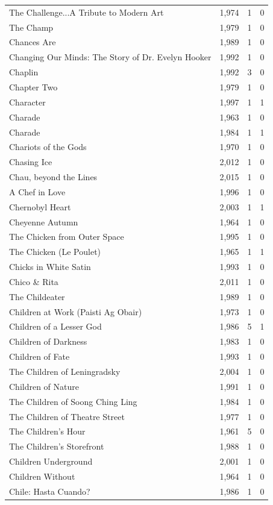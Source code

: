 \begin{tabular}{lrrr}
The Challenge...A Tribute to Modern Art & 1,974 & 1 & 0 \\
The Champ & 1,979 & 1 & 0 \\
Chances Are & 1,989 & 1 & 0 \\
Changing Our Minds: The Story of Dr. Evelyn Hooker & 1,992 & 1 & 0 \\
Chaplin & 1,992 & 3 & 0 \\
Chapter Two & 1,979 & 1 & 0 \\
Character & 1,997 & 1 & 1 \\
Charade & 1,963 & 1 & 0 \\
Charade & 1,984 & 1 & 1 \\
Chariots of the Gods & 1,970 & 1 & 0 \\
Chasing Ice & 2,012 & 1 & 0 \\
Chau, beyond the Lines & 2,015 & 1 & 0 \\
A Chef in Love & 1,996 & 1 & 0 \\
Chernobyl Heart & 2,003 & 1 & 1 \\
Cheyenne Autumn & 1,964 & 1 & 0 \\
The Chicken from Outer Space & 1,995 & 1 & 0 \\
The Chicken (Le Poulet) & 1,965 & 1 & 1 \\
Chicks in White Satin & 1,993 & 1 & 0 \\
Chico \& Rita & 2,011 & 1 & 0 \\
The Childeater & 1,989 & 1 & 0 \\
Children at Work (Paisti Ag Obair) & 1,973 & 1 & 0 \\
Children of a Lesser God & 1,986 & 5 & 1 \\
Children of Darkness & 1,983 & 1 & 0 \\
Children of Fate & 1,993 & 1 & 0 \\
The Children of Leningradsky & 2,004 & 1 & 0 \\
Children of Nature & 1,991 & 1 & 0 \\
The Children of Soong Ching Ling & 1,984 & 1 & 0 \\
The Children of Theatre Street & 1,977 & 1 & 0 \\
The Children's Hour & 1,961 & 5 & 0 \\
The Children's Storefront & 1,988 & 1 & 0 \\
Children Underground & 2,001 & 1 & 0 \\
Children Without & 1,964 & 1 & 0 \\
Chile: Hasta Cuando? & 1,986 & 1 & 0 \\

\end{tabular}
